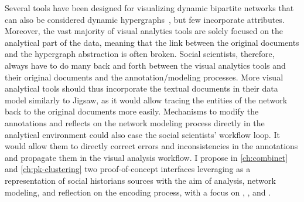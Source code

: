 

Several tools have been designed for visualizing dynamic bipartite networks that can also be considered dynamic hypergraphs~\cite{valdiviaAnalyzingDynamicHypergraphs2021, hyperstorylines}, but few incorporate attributes.
Moreover, the vast majority of visual analytics tools are solely focused on the analytical part of the data, meaning that the link between the original documents and the hypergraph abstraction is often broken.
Social scientists, therefore, always have to do many back and forth between the visual analytics tools and their original documents and the annotation/modeling processes.
More visual analytical tools should thus incorporate the textual documents in their data model similarly to Jigsaw\cite{staskoJigsawSupportingInvestigative2008}, as it would allow tracing the entities of the network back to the original documents more easily.
Mechanisms to modify the annotations and reflects on the network modeling process directly in the analytical environment could also ease the social scientists' workflow loop.
It would allow them to directly correct errors and inconsistencies in the annotations and propagate them in the visual analysis workflow.
I propose in \autoref{ch:combinet} and \autoref{ch:pk-clustering} two proof-of-concept interfaces leveraging \modelplural as a representation of social historians sources with the aim of analysis, network modeling, and reflection on the encoding process, with a focus on \traceability, \reality, and \simplicity.


